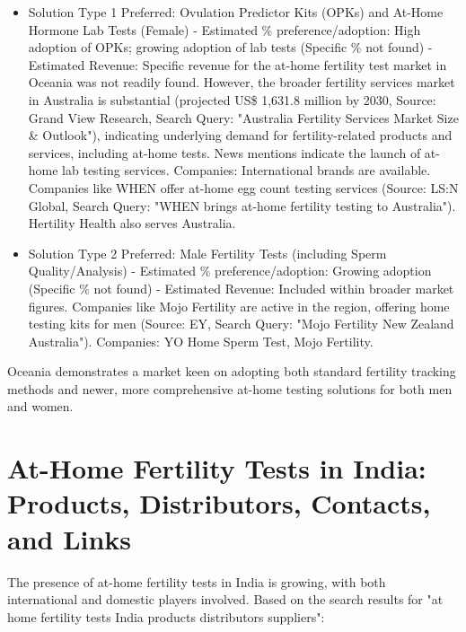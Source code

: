 \documentclass{article}
\begin{document}
\begin{itemize}
  \item Solution Type 1 Preferred: Ovulation Predictor Kits (OPKs) and At-Home Hormone Lab Tests (Female) - Estimated \% preference/adoption: High adoption of OPKs; growing adoption of lab tests (Specific \% not found) - Estimated Revenue: Specific revenue for the at-home fertility test market in Oceania was not readily found. However, the broader fertility services market in Australia is substantial (projected US\$ 1,631.8 million by 2030, Source: Grand View Research, Search Query: "Australia Fertility Services Market Size & Outlook"), indicating underlying demand for fertility-related products and services, including at-home tests. News mentions indicate the launch of at-home lab testing services.
    Companies: International brands are available. Companies like WHEN offer at-home egg count testing services (Source: LS:N Global, Search Query: "WHEN brings at-home fertility testing to Australia"). Hertility Health also serves Australia.
  \item Solution Type 2 Preferred: Male Fertility Tests (including Sperm Quality/Analysis) - Estimated \% preference/adoption: Growing adoption (Specific \% not found) - Estimated Revenue: Included within broader market figures. Companies like Mojo Fertility are active in the region, offering home testing kits for men (Source: EY, Search Query: "Mojo Fertility New Zealand Australia").
    Companies: YO Home Sperm Test, Mojo Fertility.
\end{itemize}
Oceania demonstrates a market keen on adopting both standard fertility tracking methods and newer, more comprehensive at-home testing solutions for both men and women.

\section{At-Home Fertility Tests in India: Products, Distributors, Contacts, and Links}

The presence of at-home fertility tests in India is growing, with both international and domestic players involved. Based on the search results for "at home fertility tests India products distributors suppliers":
\end{document}
